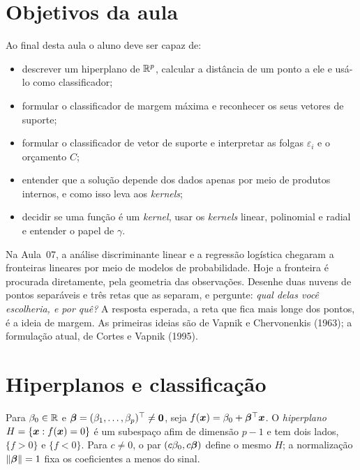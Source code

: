 \documentclass[11pt,a4paper]{article}
\begin{document}

\section*{Objetivos da aula}
Ao final desta aula o aluno deve ser capaz de:
\begin{itemize}[leftmargin=1.4cm]
  \item descrever um hiperplano de $\mathbb{R}^p$, calcular a distância de um ponto a ele e
        usá-lo como classificador;
  \item formular o classificador de margem máxima e reconhecer os seus vetores de
        suporte;
  \item formular o classificador de vetor de suporte e interpretar as folgas
        $\varepsilon_i$ e o orçamento $C$;
  \item entender que a solução depende dos dados apenas por meio de produtos
        internos, e como isso leva aos \emph{kernels};
  \item decidir se uma função é um \emph{kernel}, usar os \emph{kernels} linear,
        polinomial e radial e entender o papel de $\gamma$.
\end{itemize}

\begin{emsala}
Na Aula~07, a análise discriminante linear e a regressão logística chegaram a
fronteiras lineares por meio de modelos de probabilidade. Hoje a fronteira é
procurada diretamente, pela geometria das observações. Desenhe duas nuvens de pontos
separáveis e três retas que as separam, e pergunte: \emph{qual delas você escolheria,
e por quê?} A resposta esperada, a reta que fica mais longe dos pontos, é a ideia de
margem. As primeiras ideias são de Vapnik e Chervonenkis (1963); a formulação atual,
de Cortes e Vapnik (1995).
\end{emsala}

\section{Hiperplanos e classificação}
Para $\beta_0\in\mathbb{R}$ e $\bm{\beta}=(\beta_1,\dots,\beta_p)^\top\ne\bm 0$, seja
$f(\bm{x})=\beta_0+\bm{\beta}^\top\bm{x}$. O \emph{hiperplano} $H=\{\bm{x}: f(\bm{x})=0\}$ é um subespaço
afim de dimensão $p-1$ e tem dois lados, $\{f>0\}$ e $\{f<0\}$. Para $c\ne0$, o par
$(c\beta_0,c\bm{\beta})$ define o mesmo $H$; a normalização $\left\lVert \bm{\beta} \right\rVert=1$ fixa os
coeficientes a menos do sinal.
\end{document}

